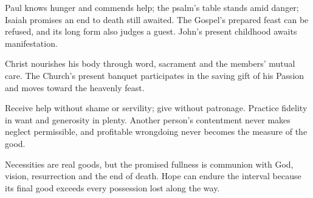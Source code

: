 \begin{fourSenses}
\item[Literal.] Paul knows hunger and commends help; the psalm's table stands amid danger; Isaiah promises an end to death still awaited. The Gospel's prepared feast can be refused, and its long form also judges a guest. John's present childhood awaits manifestation.
\item[Allegorical.] Christ nourishes his body through word, sacrament and the members' mutual care. The Church's present banquet participates in the saving gift of his Passion and moves toward the heavenly feast.
\item[Moral.] Receive help without shame or servility; give without patronage. Practice fidelity in want and generosity in plenty. Another person's contentment never makes neglect permissible, and profitable wrongdoing never becomes the measure of the good.
\item[Anagogical.] Necessities are real goods, but the promised fullness is communion with God, vision, resurrection and the end of death. Hope can endure the interval because its final good exceeds every possession lost along the way.
\end{fourSenses}
